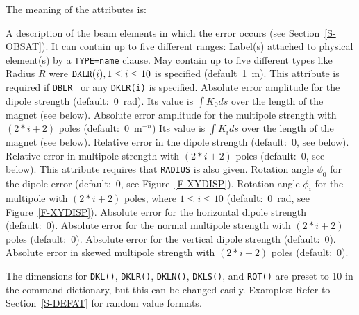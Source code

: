 The meaning of the attributes is:
\begin{mylist}
A description of the beam elements in which the error occurs
(see Section~\ref{S-OBSAT}).
It can contain up to five different ranges:
Label(s) attached to physical element(s) by a {\tt TYPE=name} clause.
May contain up to five different types like
Radius \(R\) were \(\hbox{\tt DKLR}(i), 1\leq i\leq 10\) is specified
(default~1~m).
This attribute is required if {\tt DBLR } or any {\tt DKLR(i)} is specified.
Absolute error amplitude for the dipole strength (default:~0~rad).
Its value is \(\int K_{0}ds\) over the length of the magnet
(see below).
Absolute error amplitude for the multipole strength with \((2*i + 2)\) poles
(default:~0~\(\mathrm{m}^{-n}\))
Its value is \(\int K_{i}ds\) over the length of the magnet
(see below).
Relative error in the dipole strength (default:~0, see below).
Relative error in multipole strength with \((2*i + 2)\) poles
(default:~0, see below).
This attribute requires that {\tt RADIUS} is also given.
Rotation angle \(\phi_{0}\) for the dipole error (default:~0,
see Figure~\ref{F-XYDISP}).
Rotation angle \(\phi_{i}\) for the multipole with \((2*i + 2)\) poles,
where \(1\leq i\leq 10\) (default:~0~rad, see Figure~\ref{F-XYDISP}).
Absolute error for the horizontal dipole strength (default:~0).
Absolute error for the normal multipole strength with \((2*i + 2)\) poles
(default:~0).
Absolute error for the vertical dipole strength (default:~0).
Absolute error in skewed multipole strength with \((2*i + 2)\) poles
(default:~0).
\end{mylist}
The dimensions for {\tt DKL()}, {\tt DKLR()}, {\tt DKLN()}, {\tt DKLS()},
and {\tt ROT()} are preset to 10 in the command dictionary,
but this can be changed easily.
Examples:
Refer to Section~\ref{S-DEFAT} for random value formats.
